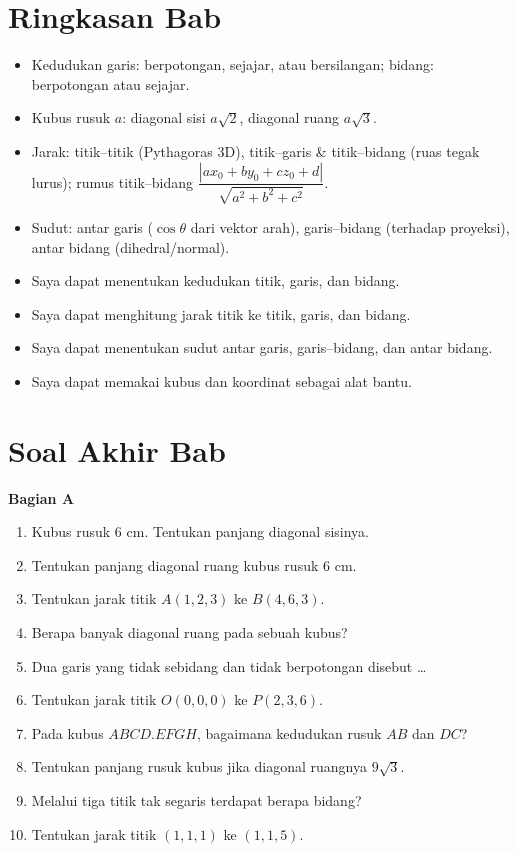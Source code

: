 \documentclass[11pt,a4paper]{report}
\theoremstyle{gaya}
\newcommand{\bagiansoal}[2]{%
  \par\medskip\noindent
  {\large\bfseries\color{biru}Bagian #1}\par\smallskip
  \addcontentsline{toc}{subsection}{Bagian #1}}
\newcommand{\cek}{\ding{113}\ } %
\begin{document}
\section*{Ringkasan Bab}
\begin{itemize}[leftmargin=*,topsep=2pt]
  \item Kedudukan garis: berpotongan, sejajar, atau bersilangan; bidang: berpotongan atau sejajar.
  \item Kubus rusuk $a$: diagonal sisi $a\sqrt2$, diagonal ruang $a\sqrt3$.
  \item Jarak: titik--titik (Pythagoras $3$D), titik--garis \& titik--bidang (ruas tegak lurus); rumus titik--bidang $\dfrac{|ax_0+by_0+cz_0+d|}{\sqrt{a^2+b^2+c^2}}$.
  \item Sudut: antar garis ($\cos\theta$ dari vektor arah), garis--bidang (terhadap proyeksi), antar bidang (dihedral/normal).
\end{itemize}

\begin{refleksi}
\begin{itemize}[leftmargin=*,topsep=2pt]
  \item[\cek] Saya dapat menentukan kedudukan titik, garis, dan bidang.
  \item[\cek] Saya dapat menghitung jarak titik ke titik, garis, dan bidang.
  \item[\cek] Saya dapat menentukan sudut antar garis, garis--bidang, dan antar bidang.
  \item[\cek] Saya dapat memakai kubus dan koordinat sebagai alat bantu.
\end{itemize}
\end{refleksi}

\section*{Soal Akhir Bab \thechapter}

\bagiansoal{A}{(Fundamental --- setara SNBT Dasar)}
\begin{enumerate}[leftmargin=*]
  \item Kubus rusuk $6$ cm. Tentukan panjang diagonal sisinya.
  \item Tentukan panjang diagonal ruang kubus rusuk $6$ cm.
  \item Tentukan jarak titik $A(1,2,3)$ ke $B(4,6,3)$.
  \item Berapa banyak diagonal ruang pada sebuah kubus?
  \item Dua garis yang tidak sebidang dan tidak berpotongan disebut \dots
  \item Tentukan jarak titik $O(0,0,0)$ ke $P(2,3,6)$.
  \item Pada kubus $ABCD.EFGH$, bagaimana kedudukan rusuk $AB$ dan $DC$?
  \item Tentukan panjang rusuk kubus jika diagonal ruangnya $9\sqrt3$.
  \item Melalui tiga titik tak segaris terdapat berapa bidang?
  \item Tentukan jarak titik $(1,1,1)$ ke $(1,1,5)$.
\end{enumerate}
\end{document}

